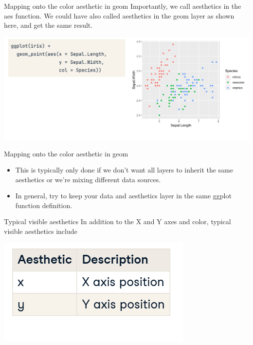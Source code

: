 \documentclass[
  ignorenonframetext,
]{beamer}
\begin{document}
\begin{frame}{Mapping onto the color aesthetic in geom}
\label{mapping-onto-the-color-aesthetic-in-geom}
Importantly, we call aesthetics in the aes function. We could have also
called aesthetics in the geom layer as shown here, and get the same
result.

\includegraphics{../images/im138.png}
\end{frame}

\begin{frame}{Mapping onto the color aesthetic in geom}
\label{mapping-onto-the-color-aesthetic-in-geom-1}
\begin{itemize}
\item
  This is typically only done if we don't want all layers to inherit the
  same aesthetics or we're mixing different data sources.
\item
  In general, try to keep your data and aesthetics layer in the same
  ggplot function definition.
\end{itemize}
\end{frame}

\begin{frame}{Typical visible aesthetics}
\label{typical-visible-aesthetics}
In addition to the X and Y axes and color, typical visible aesthetics
include

\includegraphics{../images/im139.png}
\end{frame}
\end{document}

